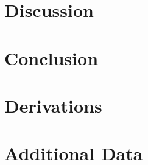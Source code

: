 \documentclass[11pt]{article}
\begin{document}
\section{Discussion}




\section{Conclusion}



\appendix

\section{Derivations}


\section{Additional Data}



% 
% 
\end{document}
